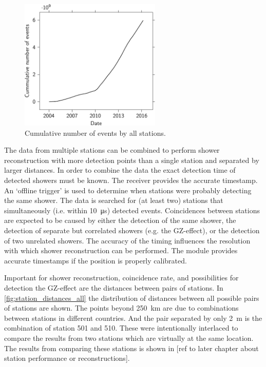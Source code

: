 \begin{figure}
    \centering
    \includegraphics[width=0.6\textwidth]
                    {plots/cluster/luminosity_network}
    \caption{Cumulative number of events by all stations.}
    \label{fig:luminosity_network}
\end{figure}

The data from multiple \hisparc stations can be combined to perform shower reconstruction with more detection points than a single station and separated by larger distances. In order to combine the data the exact detection time of  detected showers must be known. The \gps receiver provides the accurate timestamp. An `offline trigger' is used to determine when stations were probably detecting the same shower. The data is searched for (at least two) stations that simultaneously (i.e. within \SI{10}{\us}) detected events. Coincidences between stations are expected to be caused by either the detection of the same shower, the detection of separate but correlated showers (e.g. the GZ-effect), or the detection of two unrelated showers. The accuracy of the timing influences the resolution with which shower reconstruction can be performed. The \gps module provides accurate timestamps if the position is properly calibrated.

Important for shower reconstruction, coincidence rate, and possibilities for detection the GZ-effect are the distances between pairs of stations. In \cref{fig:station_distances_all} the distribution of distances between all possible pairs of stations are shown. The points beyond \SI{250}{\kilo\meter} are due to combinations between stations in different countries. And the pair separated by only \SI{2}{\meter} is the combination of station 501 and 510. These were intentionally interlaced to compare the results from two stations which are virtually at the same location. The results from comparing these stations is shown in [ref to later chapter about station performance or reconstructions].


